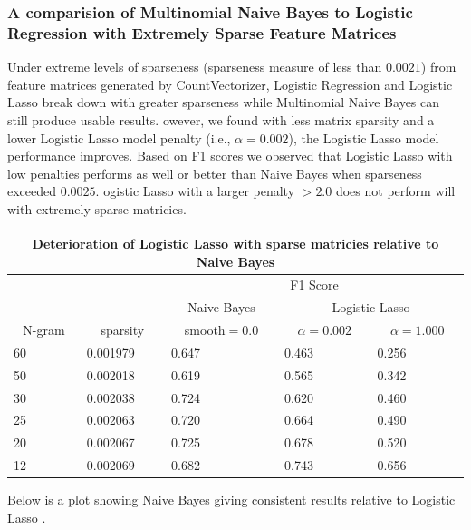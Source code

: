 \documentclass[11pt]{article}
\newcommand{\vertSpace}[1]{\vspace{3mm}}
\begin{document}
{\subsubsection{A comparision of Multinomial Naive Bayes to Logistic Regression with Extremely Sparse Feature Matrices}
\noindent
Under extreme levels of sparseness (sparseness measure of less than $0.0021$) from feature matrices generated by CountVectorizer, Logistic Regression and Logistic Lasso break down with greater sparseness while Multinomial Naive Bayes can still produce usable results. \vertSpace


However, we found with less matrix sparsity and a lower Logistic Lasso model penalty (i.e., $\alpha=0.002$), the Logistic Lasso model performance improves.  Based on F1 scores we observed that Logistic Lasso with low penalties performs as well or better than Naive Bayes when sparseness exceeded $0.0025$.  \vertSpace


Logistic Lasso with a larger penalty $>2.0$ does not perform will with extremely sparse matricies. \\
\begin{center}
\noindent \begin{tabular}{ |p{2cm}||p{2cm}|p{2cm}|p{2cm}|p{2cm}|  }
 \hline

 \multicolumn{5}{|c|}{Deterioration of Logistic Lasso with sparse matricies relative to Naive Bayes} \\
 \hline
 \multicolumn{1}{|c|}{} &
 \multicolumn{1}{|c|}{} &
 \multicolumn{3}{|c|}{F1 Score} \\

 \hline
 \multicolumn{1}{|c|}{} &
 \multicolumn{1}{|c|}{} &
 \multicolumn{1}{|c|}{Naive Bayes} &
 \multicolumn{2}{|c|}{Logistic Lasso} \\

 \hline
 \multicolumn{1}{|c|}{N-gram} &
 \multicolumn{1}{|c|}{sparsity} &
 \multicolumn{1}{|c|}{smooth$=0.0$} &
 \multicolumn{1}{|c|}{$\alpha=0.002$} &
 \multicolumn{1}{|c|}{$\alpha=1.000$} \\
 \hline
 60& 0.001979 & 0.647 & 0.463 & 0.256\\
 50& 0.002018 & 0.619 & 0.565 & 0.342\\
 30& 0.002038 & 0.724 & 0.620 & 0.460\\
 25& 0.002063 & 0.720 & 0.664 & 0.490\\
 20& 0.002067 & 0.725 & 0.678 & 0.520\\
 12& 0.002069 & 0.682 & 0.743 & 0.656\\
 \hline
\end{tabular}
\end{center}
\vertSpace
\noindent Below is a plot showing Naive Bayes giving consistent results relative
to Logistic Lasso .

}
\end{document}
